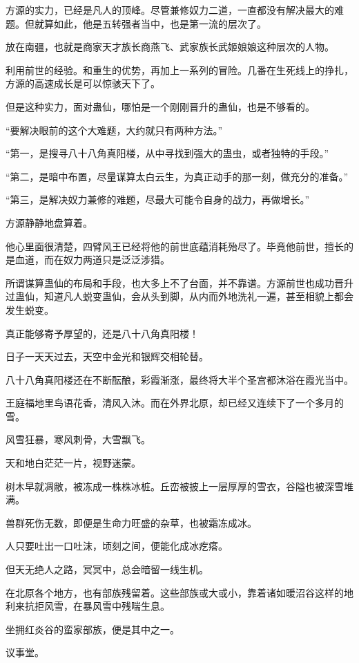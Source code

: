 \begin{this_body}
方源的实力，已经是凡人的顶峰。尽管兼修奴力二道，一直都没有解决最大的难题。但就算如此，他是五转强者当中，也是第一流的层次了。

放在南疆，也就是商家天才族长商燕飞、武家族长武姬娘娘这种层次的人物。

利用前世的经验。和重生的优势，再加上一系列的冒险。几番在生死线上的挣扎，方源的高速成长是可以惊骇天下了。

但是这种实力，面对蛊仙，哪怕是一个刚刚晋升的蛊仙，也是不够看的。

“要解决眼前的这个大难题，大约就只有两种方法。”

“第一，是搜寻八十八角真阳楼，从中寻找到强大的蛊虫，或者独特的手段。”

“第二，是暗中布置，尽量谋算太白云生，为真正动手的那一刻，做充分的准备。”

“第三，是解决奴力兼修的难题，尽最大可能令自身的战力，再做增长。”

方源静静地盘算着。

他心里面很清楚，四臂风王已经将他的前世底蕴消耗殆尽了。毕竟他前世，擅长的是血道，而在奴力两道只是泛泛涉猎。

所谓谋算蛊仙的布局和手段，也大多上不了台面，并不靠谱。方源前世也成功晋升过蛊仙，知道凡人蜕变蛊仙，会从头到脚，从内而外地洗礼一遍，甚至相貌上都会发生蜕变。

真正能够寄予厚望的，还是八十八角真阳楼！

日子一天天过去，天空中金光和银辉交相轮替。

八十八角真阳楼还在不断酝酿，彩霞渐涨，最终将大半个圣宫都沐浴在霞光当中。

王庭福地里鸟语花香，清风入沐。而在外界北原，却已经又连续下了一个多月的雪。

风雪狂暴，寒风刺骨，大雪飘飞。

天和地白茫茫一片，视野迷蒙。

树木早就凋敝，被冻成一株株冰桩。丘峦被披上一层厚厚的雪衣，谷隘也被深雪堆满。

兽群死伤无数，即便是生命力旺盛的杂草，也被霜冻成冰。

人只要吐出一口吐沫，顷刻之间，便能化成冰疙瘩。

但天无绝人之路，冥冥中，总会暗留一线生机。

在北原各个地方，也有部族残留着。这些部族或大或小，靠着诸如暖沼谷这样的地利来抗拒风雪，在暴风雪中残喘生息。

坐拥红炎谷的蛮家部族，便是其中之一。

议事堂。


\end{this_body}
